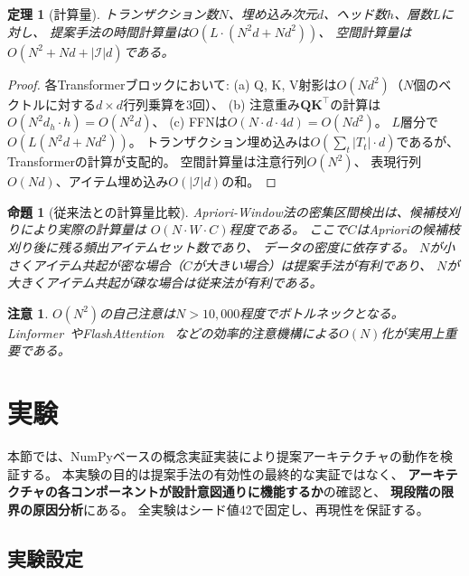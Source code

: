 \documentclass[sigconf,nonacm]{acmart}
\newtheorem{theorem}{定理}
\newtheorem{proposition}{命題}
\newtheorem{remark}{注意}
\begin{document}
\begin{theorem}[計算量]
\label{thm:complexity}
トランザクション数$N$、埋め込み次元$d$、ヘッド数$h$、層数$L$に対し、
提案手法の時間計算量は$O(L \cdot (N^2 d + N d^2))$、
空間計算量は$O(N^2 + Nd + |\mathcal{I}|d)$である。
\end{theorem}

\begin{proof}
各Transformerブロックにおいて:
(a) Q, K, V射影は$O(N d^2)$（$N$個のベクトルに対する$d \times d$行列乗算を3回）、
(b) 注意重み$\mathbf{Q}\mathbf{K}^\top$の計算は$O(N^2 d_h \cdot h) = O(N^2 d)$、
(c) FFNは$O(N \cdot d \cdot 4d) = O(Nd^2)$。
$L$層分で$O(L(N^2 d + Nd^2))$。
トランザクション埋め込みは$O(\sum_t |T_t| \cdot d)$であるが、
Transformerの計算が支配的。
空間計算量は注意行列$O(N^2)$、
表現行列$O(Nd)$、アイテム埋め込み$O(|\mathcal{I}|d)$の和。
\end{proof}

\begin{proposition}[従来法との計算量比較]
\label{prop:comparison}
Apriori-Window法の密集区間検出は、候補枝刈りにより実際の計算量は
$O(N \cdot W \cdot C)$程度である。
ここで$C$はAprioriの候補枝刈り後に残る頻出アイテムセット数であり、
データの密度に依存する。
$N$が小さくアイテム共起が密な場合（$C$が大きい場合）は提案手法が有利であり、
$N$が大きくアイテム共起が疎な場合は従来法が有利である。
\end{proposition}

\begin{remark}
$O(N^2)$の自己注意は$N > 10{,}000$程度でボトルネックとなる。
Linformer~\cite{wang2020linformer}やFlashAttention~\cite{dao2022flashattention}
などの効率的注意機構による$O(N)$化が実用上重要である。
\end{remark}

\section{実験}
\label{sec:experiments}

本節では、NumPyベースの概念実証実装により提案アーキテクチャの動作を検証する。
本実験の目的は提案手法の有効性の最終的な実証ではなく、
\textbf{アーキテクチャの各コンポーネントが設計意図通りに機能するか}の確認と、
\textbf{現段階の限界の原因分析}にある。
全実験はシード値42で固定し、再現性を保証する。

\subsection{実験設定}
\end{document}
